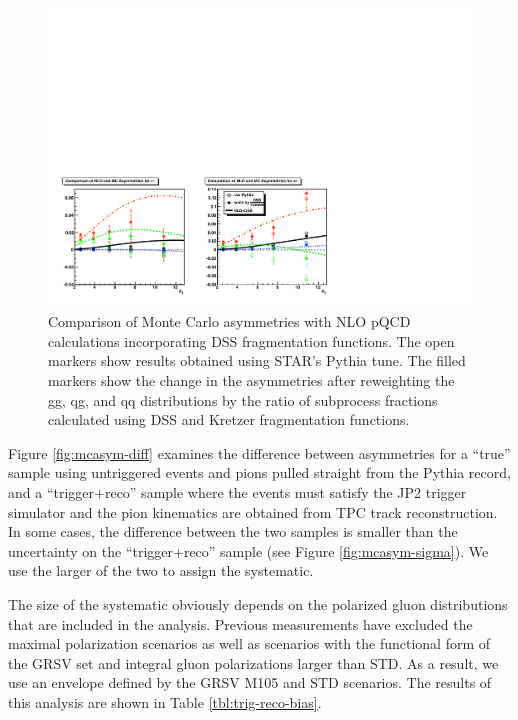 \begin{figure}
  \includegraphics[width=\textwidth]{figures/compare-mcasym-nlo}
  \caption{Comparison of Monte Carlo asymmetries with NLO pQCD calculations
  incorporating DSS fragmentation functions. The open markers show results
  obtained using STAR's Pythia tune. The filled markers show the change in the
  asymmetries after reweighting the gg, qg, and qq distributions by the ratio
  of subprocess fractions calculated using DSS and Kretzer fragmentation
  functions.}
  \label{fig:compare-mcasym-nlo}
\end{figure}

Figure \ref{fig:mcasym-diff} examines the difference between asymmetries for a ``true'' sample using untriggered events and pions pulled straight from the Pythia record, and a ``trigger+reco'' sample where the events must satisfy the JP2 trigger simulator and the pion kinematics are obtained from TPC track reconstruction.  In some cases, the difference between the two samples is smaller than the uncertainty on the ``trigger+reco'' sample (see Figure \ref{fig:mcasym-sigma}).  We use the larger of the two to assign the systematic.

The size of the systematic obviously depends on the polarized gluon distributions that are included in the analysis.  Previous measurements have excluded the maximal polarization scenarios as well as scenarios with the functional form of the GRSV set and integral gluon polarizations larger than STD.  As a result, we use an envelope defined by the GRSV M105 and STD scenarios.  The results of this analysis are shown in Table \ref{tbl:trig-reco-bias}.

